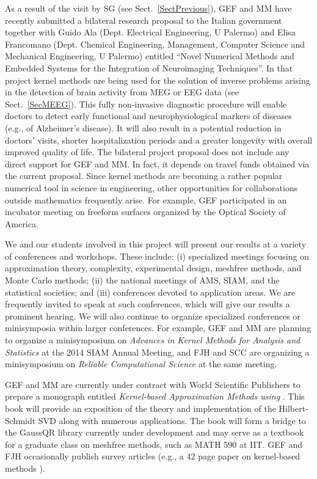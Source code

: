 \begin{description}[leftmargin=2.5ex]
\item[Collaborating with Engineers]
As a result of the visit by SG (see Sect.~\ref{SectPrevious}), GEF and MM have recently submitted a bilateral research proposal to the Italian government together with Guido Ala (Dept. Electrical Engineering, U Palermo) and Elisa Francomano (Dept. Chemical Engineering, Management, Computer Science and Mechanical Engineering, U Palermo) entitled ``Novel Numerical Methods and Embedded Systems for the Integration of Neuroimaging Techniques''. In that project kernel methods are being used for the solution of inverse problems arising in the detection of brain activity from MEG or EEG data (see Sect.~\ref{SecMEEG}). This fully non-invasive diagnostic procedure will enable doctors to detect early functional and neurophysiological markers of diseases (e.g., of Alzheimer's disease). It will also result in a potential reduction in doctors' visits, shorter hospitalization periods and a greater longevity with overall improved quality of life. The bilateral project proposal does not include any direct support for GEF and MM. In fact, it depends on travel funds obtained via the current proposal. Since kernel methods are becoming a rather popular numerical tool in science in engineering, other opportunities for collaborations outside mathematics frequently arise. For example, GEF participated in an incubator meeting on freeform surfaces organized by the Optical Society of America.

\item[Organizing and Presenting at Conferences]
We and our students involved in this project will present our results at a variety of conferences and workshops.  These include: (i) specialized meetings focusing on approximation theory, complexity, experimental design, meshfree methods, and Monte Carlo methods; (ii) the national meetings of AMS, SIAM, and the statistical societies; and (iii) conferences devoted to application areas.  We are frequently invited to speak at such conferences, which will give our results a prominent hearing. We will also continue to organize specialized conferences or minisymposia within larger conferences. For example, GEF and MM are planning to organize a minisymposium on \emph{Advances in Kernel Methods for Analysis and Statistics} at the 2014 SIAM Annual Meeting, and FJH and SCC are organizing a minisymposium on \emph{Reliable Computational Science} at the same meeting.

\item[Writing Textbooks and Survey Papers]
GEF and MM are currently under contract with \linebreak[4] World Scientific Publishers to prepare a monograph entitled \emph{Kernel-based Approximation Methods using \Matlab}. This book will provide an exposition of the theory and implementation of the Hilbert-Schmidt SVD along with numerous applications. The book will form a bridge to the GaussQR library currently under development and may serve as a textbook for a graduate class on meshfree methods, such as MATH 590 at IIT. GEF and FJH occasionally publish survey articles (e.g., a 42 page paper on kernel-based methods \citep{Fasshauer11}).


\end{description}
